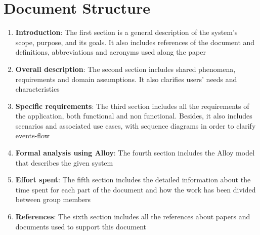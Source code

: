 \section{Document Structure}
\begin{enumerate}
  \item \textbf{Introduction}: The first section is a general description of the system's scope, purpose, and its 
  goals. It also includes references of the document and definitions, abbreviations and acronyms used along the paper
  \item \textbf{Overall description}: The second section includes shared phenomena, requirements and domain assumptions. It also clarifies users' needs and characteristics
  \item \textbf{Specific requirements}: The third section includes all the requirements of the application, both functional and non functional. Besides, it also
  includes scenarios and associated use cases, with sequence diagrams in order to clarify events-flow
  \item \textbf{Formal analysis using Alloy}: The fourth section includes the Alloy model that describes the given system
  \item \textbf{Effort spent}: The fifth section includes the detailed information about the time spent for each part of the document and how the work has been divided between group members
  \item \textbf{References}: The sixth section includes all the references about papers and documents used to support this document
\end{enumerate}